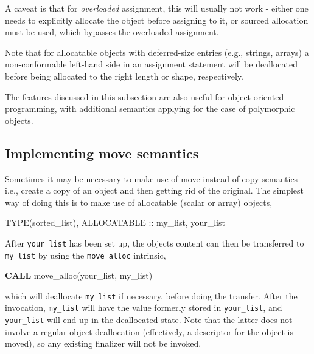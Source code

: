 \documentclass[]{scrartcl}
\newenvironment{Shaded}{}{}
\newcommand{\DataTypeTok}[1]{\textcolor[rgb]{0.56,0.13,0.00}{#1}}
\newcommand{\KeywordTok}[1]{\textcolor[rgb]{0.00,0.44,0.13}{\textbf{#1}}}
\newcommand{\NormalTok}[1]{#1}
\begin{document}
A caveat is that for \emph{overloaded} assignment, this will usually not
work - either one needs to explicitly allocate the object before
assigning to it, or sourced allocation must be used, which bypasses the
overloaded assignment.

Note that for allocatable objects with deferred-size entries (e.g.,
strings, arrays) a non-conformable left-hand side in an assignment
statement will be deallocated before being allocated to the right length
or shape, respectively.

The features discussed in this subsection are also useful for
object-oriented programming, with additional semantics applying for the
case of polymorphic objects.

\subsection{Implementing move
semantics}\label{implementing-move-semantics}

Sometimes it may be necessary to make use of move instead of copy
semantics i.e., create a copy of an object and then getting rid of the
original. The simplest way of doing this is to make use of allocatable
(scalar or array) objects,

\begin{Shaded}
\begin{Highlighting}[]
\DataTypeTok{TYPE(sorted\_list)}\NormalTok{, }\DataTypeTok{ALLOCATABLE} \DataTypeTok{::}\NormalTok{ my\_list, your\_list}
\end{Highlighting}
\end{Shaded}

After \texttt{your\_list} has been set up, the object\textquotesingle s
content can then be transferred to \texttt{my\_list} by using the
\texttt{move\_alloc} intrinsic,

\begin{Shaded}
\begin{Highlighting}[]
\KeywordTok{CALL}\NormalTok{ move\_alloc(your\_list, my\_list)}
\end{Highlighting}
\end{Shaded}

which will deallocate \texttt{my\_list} if necessary, before doing the
transfer. After the invocation, \texttt{my\_list} will have the value
formerly stored in \texttt{your\_list}, and \texttt{your\_list} will end
up in the deallocated state. Note that the latter does not involve a
regular object deallocation (effectively, a descriptor for the object is
moved), so any existing finalizer will not be invoked.
\end{document}
